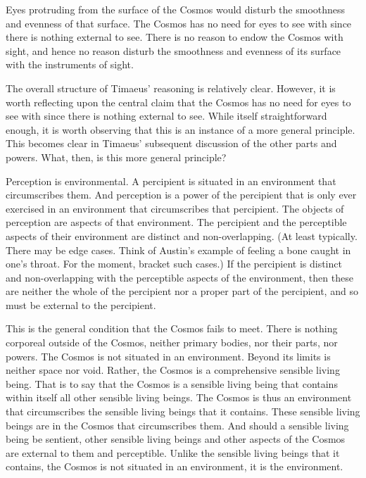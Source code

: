 Eyes protruding from the surface of the Cosmos would disturb the smoothness and evenness of that surface. The Cosmos has no need for eyes to see with since there is nothing external to see. There is no reason to endow the Cosmos with sight, and hence no reason disturb the smoothness and evenness of its surface with the instruments of sight.

The overall structure of Timaeus' reasoning is relatively clear. However, it is worth reflecting upon the central claim that the Cosmos has no need for eyes to see with since there is nothing external to see. While itself straightforward enough, it is worth observing that this is an instance of a more general principle. This becomes clear in Timaeus' subsequent discussion of the other parts and powers. What, then, is this more general principle?

Perception is environmental. A percipient is situated in an environment that circumscribes them. And perception is a power of the percipient that is only ever exercised in an environment that circumscribes that percipient. The objects of perception are aspects of that environment. The percipient and the perceptible aspects of their environment are distinct and non-overlapping. (At least typically. There may be edge cases. Think of Austin's example of feeling a bone caught in one's throat. For the moment, bracket such cases.) If the percipient is distinct and non-overlapping with the perceptible aspects of the environment, then these are neither the whole of the percipient nor a proper part of the percipient, and so must be external to the percipient. 

This is the general condition that the Cosmos fails to meet. There is nothing corporeal outside of the Cosmos, neither primary bodies, nor their parts, nor powers. The Cosmos is not situated in an environment. Beyond its limits is neither space nor void. Rather, the Cosmos is a comprehensive sensible living being. That is to say that the Cosmos is a sensible living being that contains within itself all other sensible living beings. The Cosmos is thus an environment that circumscribes the sensible living beings that it contains. These sensible living beings are in the Cosmos that circumscribes them. And should a sensible living being be sentient, other sensible living beings and other aspects of the Cosmos are external to them and perceptible. Unlike the sensible living beings that it contains, the Cosmos is not situated in an environment, it is the environment.


